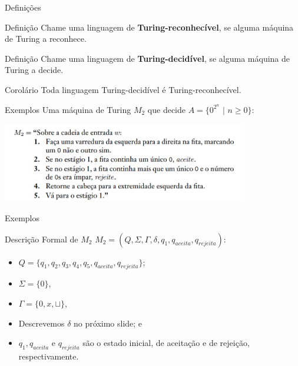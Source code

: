 \documentclass[xcolor=dvipsnames,table]{beamer}
\begin{document}
	 \begin{frame}{Definições}
		\begin{block}{Definição}
			Chame uma linguagem de {\bf Turing-reconhecível}, se alguma máquina de Turing a reconhece.
		\end{block}
		\begin{block}{Definição}
			Chame uma linguagem de {\bf Turing-decidível}, se alguma máquina de Turing a decide.
		\end{block}
		\begin{block}{Corolário}
			Toda linguagem Turing-decidível é Turing-reconhecível.
		\end{block}
	\end{frame}		
	
	\begin{frame}{Exemplos}
		Uma máquina de Turing $M_2$ que decide $A = \{ 0^{2^n} \mbox{ | } n \geq 0 \}$: 
		\begin{center}
			\includegraphics[height=3.5cm]{images/m2.png}
		\end{center}
	\end{frame}
	
	\begin{frame}{Exemplos}
		\begin{block}{Descrição Formal de $M_2$}
			$M_2 = (Q, \Sigma, \Gamma, \delta, q_1, q_{aceita}, q_{rejeita})$:
			\begin{itemize}
				\item $Q = \{ q_1, q_2, q_3, q_4, q_5, q_{aceita}, q_{rejeita} \}$;
				\item $\Sigma = \{ 0 \}$,
				\item $\Gamma = \{ 0, x, \sqcup \}$,
				\item Descrevemos $\delta$ no próximo slide; e
				\item $q_1, q_{aceita}$ e $q_{rejeita}$ são o estado inicial, de aceitação e de rejeição, respectivamente.
			\end{itemize}
		\end{block}
	\end{frame}
	
\end{document}
